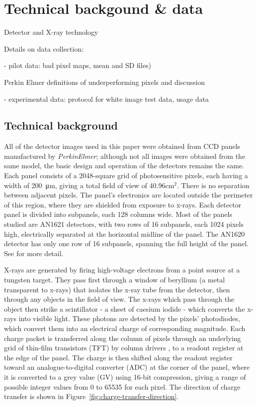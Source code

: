 \documentclass[\main/IO-Pixels.tex]{subfiles}
\begin{document}
 
 
\section{Technical backgound \& data}
\begin{outline}
Detector and X-ray technology

Details on data collection: 

- pilot data: bad pixel maps, mean and SD files)

  Perkin Elmer definitions of underperforming pixels and discussion
  
- experimental data: protocol for white image test data, usage data
\end{outline}

\subsection{Technical background}

All of the detector images used in this paper were obtained from CCD panels manufactured by \textit{PerkinElmer}; although not all images were obtained from the same model, the basic design and operation of the detectors remains the same. Each panel consists of a 2048-square grid of photosensitive pixels, each having a width of \SI{200}{\micro\meter}, giving a total field of view of 40.96cm$^2$. There is no separation between adjacent pixels. The panel's electronics are located outside the perimeter of this region, where they are shielded from exposure to x-rays. Each detector panel is divided into subpanels, each 128 columns wide. Most of the panels studied are AN1621 detectors, with two rows of 16 subpanels, each 1024 pixels high, electrically separated at the horizontal midline of the panel. The AN1620 detector has only one row of 16 subpanels, spanning the full height of the panel. See \cite{PerkinElmerManual} for more detail.

X-rays are generated by firing high-voltage electrons from a point source at a tungsten target. They pass first through a window of beryllium (a metal transparent to x-rays) that isolates the x-ray tube from the detector, then through any objects in the field of view. The x-rays which pass through the object then strike a scintillator - a sheet of caesium iodide - which converts the x-rays into visible light. These photons are detected by the pixels' photodiodes, which convert them into an electrical charge of corresponding magnitude. Each charge packet is transferred  along the column of pixels through an underlying grid of thin-film transistors (TFT) by column drivers , to a readout register at the edge of the panel. The charge is then shifted along the readout register toward an analogue-to-digital converter (ADC) at the corner of the panel, where it is converted to a grey value (GV) using 16-bit compression, giving a range of possible integer values from 0 to 65535 for each pixel. The direction of charge transfer is shown in Figure~\ref{fig:charge-transfer-direction}.
\end{document}

